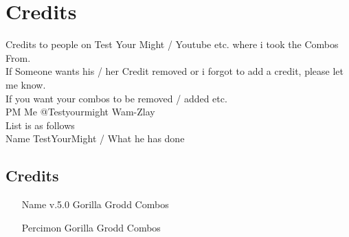 \documentclass[main.tex]{subfiles}
\begin{document}
\chapter{Credits}

Credits to people on Test Your Might / Youtube etc. where i took the Combos From.\\If Someone wants his / her Credit removed or i forgot to add a credit, please let me know.\\
If you want your combos to be removed / added etc.\\
PM Me @Testyourmight Wam-Zlay\\

List is as follows\\

Name TestYourMight / What he has done\\

\section{Credits}

\begin{itemize}
\item [Name v.5.0] Gorilla Grodd Combos 
\item [Percimon] Gorilla Grodd Combos
\end{itemize}
\end{document}
